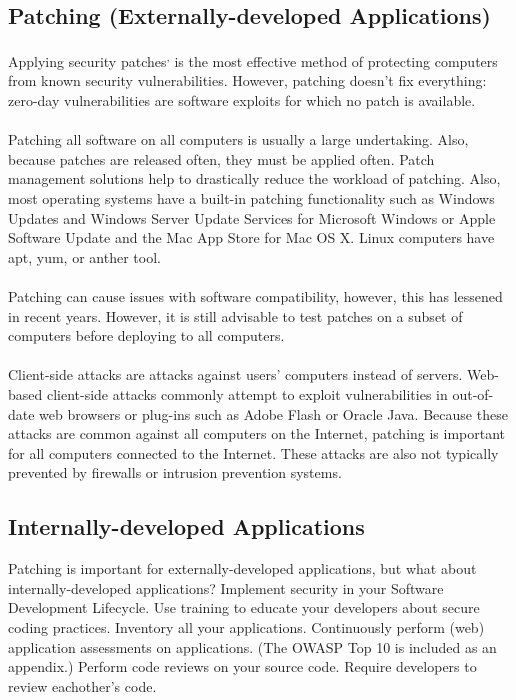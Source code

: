 \subsection{Patching (Externally-developed Applications)}
Applying security patches\textsuperscript{,} is the most effective method of protecting computers from known security vulnerabilities. However, patching doesn't fix everything: zero-day vulnerabilities are software exploits for which no patch is available.\\\\
Patching all software on all computers is usually a large undertaking. Also, because patches are released often, they must be applied often. Patch management solutions help to drastically reduce the workload of patching. Also, most operating systems have a built-in patching functionality such as Windows Updates and Windows Server Update Services for Microsoft Windows or Apple Software Update and the Mac App Store for Mac OS X. Linux computers have apt, yum, or anther tool.\\\\
Patching can cause issues with software compatibility, however, this has lessened in recent years. However, it is still advisable to test patches on a subset of computers before deploying to all computers.\\\\
Client-side attacks are attacks against users' computers instead of servers. Web-based client-side attacks commonly attempt to exploit vulnerabilities in out-of-date web browsers or plug-ins such as Adobe Flash or Oracle Java. Because these attacks are common against all computers on the Internet, patching is important for all computers connected to the Internet. These attacks are also not typically prevented by firewalls or intrusion prevention systems.
\subsection{Internally-developed Applications}\label{subsec:"Internally-developed Applications"}
Patching is important for externally-developed applications, but what about internally-developed applications? Implement security in your Software Development Lifecycle. Use training to educate your developers about secure coding practices. Inventory all your applications. Continuously perform (web) application assessments on applications. (The OWASP Top 10 is included as an appendix.) Perform code reviews on your source code. Require developers to review eachother's code.
